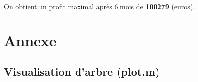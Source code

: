 \documentclass[10pt,a4paper]{article}
\begin{document}
On obtient un profit maximal après 6 mois de \textbf{100279} (euros).

\section{Annexe}

\subsection{Visualisation d'arbre (plot.m)}


\end{document}
